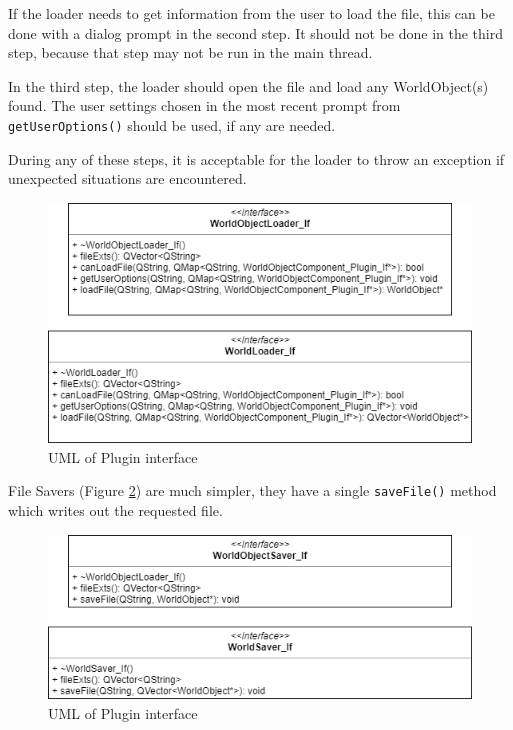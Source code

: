  If the loader needs to get information from the user to load the file, this can be done with a dialog prompt in the second step. It should not be done in the third step, because that step may not be run in the main thread.

 In the third step, the loader should open the file and load any WorldObject(s) found. The user settings chosen in the most recent prompt from \lstinline|getUserOptions()| should be used, if any are needed.

 During any of these steps, it is acceptable for the loader to throw an exception if unexpected situations are encountered.

 \begin{figure}[h]
	\begin{center}
	\includegraphics[scale=0.5]{./images_design/uml/Loader_If}
	\caption{UML of Plugin interface\label{uml:fileload_if}}
	\end{center}
\end{figure} 

 File Savers (Figure \ref{uml:filesave_if}) are much simpler, they have a single \lstinline|saveFile()| method which writes out the requested file.

 \begin{figure}[h]
	\begin{center}
	\includegraphics[scale=0.5]{./images_design/uml/Saver_If}
	\caption{UML of Plugin interface\label{uml:filesave_if}}
	\end{center}
\end{figure}

